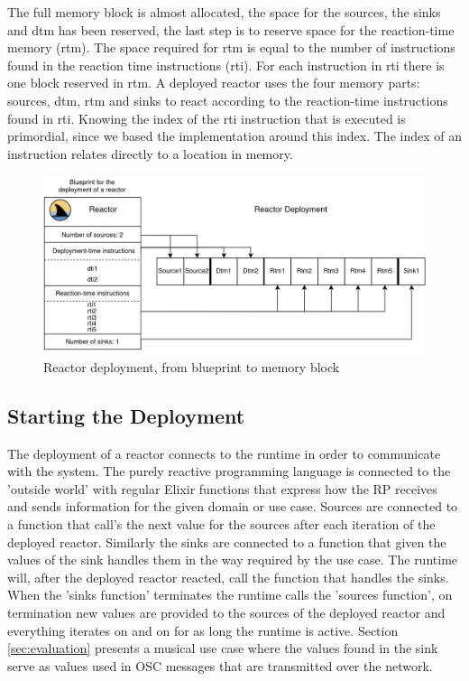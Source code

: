 \documentclass[a4paper]{book}
\begin{document}
The full memory block is almost allocated, the space for the sources, the sinks and dtm has been reserved, the last step is to reserve space for the reaction-time memory (rtm). The space required for rtm is equal to the number of instructions found in the reaction time instructions (rti). For each instruction in rti there is one block reserved in rtm. A deployed reactor uses the four memory parts: sources, dtm, rtm and sinks to react according to the reaction-time instructions found in rti. Knowing the index of the rti instruction that is executed is primordial, since we based the implementation around this index. The index of an instruction relates directly to a location in memory. 

\begin{figure}[h]
	\includegraphics[width=\textwidth]{rd.drawio}
	\caption{Reactor deployment, from blueprint to memory block}
	\label{fig:rde}
\end{figure} 

\subsection{Starting the Deployment}
The deployment of a reactor connects to the runtime in order to communicate with the system. The purely reactive programming language is connected to the 'outside world' with regular Elixir functions that express how the RP receives and sends information for the given domain or use case. Sources are connected to a function that call's the next value for the sources after each iteration of the deployed reactor. Similarly the sinks are connected to a function that given the values of the sink handles them in the way required by the use case. The runtime will, after the deployed reactor reacted, call the function that handles the sinks. When the 'sinks function' terminates the runtime calls the 'sources function', on termination new values are provided to the sources of the deployed reactor and everything iterates on and on for as long the runtime is active. Section \ref{sec:evaluation} presents a musical use case where the values found in the sink serve as values used in OSC messages that are transmitted over the network.
\end{document}
